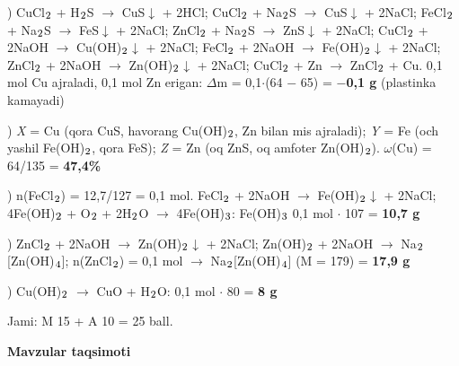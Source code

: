 \documentclass[11pt,a4paper]{article}
\renewcommand{\textsubscript}[1]{\ensuremath{_{\text{\fontsize{8}{8}\selectfont #1}}}}
\begin{document}
) CuCl\textsubscript{2} + H\textsubscript{2}S $\to$ CuS$\downarrow$ + 2HCl; CuCl\textsubscript{2} + Na\textsubscript{2}S $\to$ CuS$\downarrow$ + 2NaCl; FeCl\textsubscript{2} + Na\textsubscript{2}S $\to$ FeS$\downarrow$ + 2NaCl; ZnCl\textsubscript{2} + Na\textsubscript{2}S $\to$ ZnS$\downarrow$ + 2NaCl; CuCl\textsubscript{2} + 2NaOH $\to$ Cu(OH)\textsubscript{2}$\downarrow$ + 2NaCl; FeCl\textsubscript{2} + 2NaOH $\to$ Fe(OH)\textsubscript{2}$\downarrow$ + 2NaCl; ZnCl\textsubscript{2} + 2NaOH $\to$ Zn(OH)\textsubscript{2}$\downarrow$ + 2NaCl; CuCl\textsubscript{2} + Zn $\to$ ZnCl\textsubscript{2} + Cu. 0,1 mol Cu ajraladi, 0,1 mol Zn erigan: $\Delta$m = 0,1$\cdot$(64 $-$ 65) = \textbf{$-$0,1 g} (plastinka kamayadi)\par
{}) \textit{X} = Cu (qora CuS, havorang Cu(OH)\textsubscript{2}, Zn bilan mis ajraladi); \textit{Y} = Fe (och yashil Fe(OH)\textsubscript{2}, qora FeS); \textit{Z} = Zn (oq ZnS, oq amfoter Zn(OH)\textsubscript{2}). $\omega$(Cu) = 64/135 = \textbf{47,4\%}\par
{}) n(FeCl\textsubscript{2}) = 12,7/127 = 0,1 mol. FeCl\textsubscript{2} + 2NaOH $\to$ Fe(OH)\textsubscript{2}$\downarrow$ + 2NaCl; 4Fe(OH)\textsubscript{2} + O\textsubscript{2} + 2H\textsubscript{2}O $\to$ 4Fe(OH)\textsubscript{3}: Fe(OH)\textsubscript{3} 0,1 mol $\cdot$ 107 = \textbf{10,7 g}\par
{}) ZnCl\textsubscript{2} + 2NaOH $\to$ Zn(OH)\textsubscript{2}$\downarrow$ + 2NaCl; Zn(OH)\textsubscript{2} + 2NaOH $\to$ Na\textsubscript{2}[Zn(OH)\textsubscript{4}]; n(ZnCl\textsubscript{2}) = 0,1 mol $\to$ Na\textsubscript{2}[Zn(OH)\textsubscript{4}] (M = 179) = \textbf{17,9 g}\par
{}) Cu(OH)\textsubscript{2} $\to$ CuO + H\textsubscript{2}O: 0,1 mol $\cdot$ 80 = \textbf{8 g}\par
\noindent Jami: M 15 + A 10 = 25 ball.\par
\par\bigskip\noindent\textbf{Mavzular taqsimoti}\par\smallskip
\end{document}
